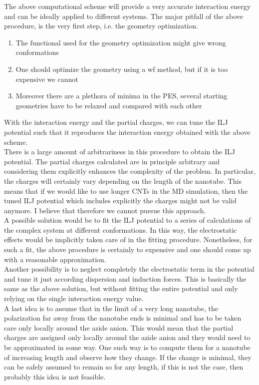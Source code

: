 \documentclass{article}
\begin{document}
%
The above computational scheme will provide a very accurate interaction energy and can be ideally applied to different systems. The major pitfall of the above procedure, is the very first step, i.e. the geometry optimization.
%
\begin{enumerate}
    \item The functional used for the geometry optimization might give wrong conformations
    \item One should optimize the geometry using a wf method, but if it is too expensive we cannot
    \item Moreover there are a plethora of minima in the PES, several starting geometries have to be relaxed and compared with each other
\end{enumerate}
%
\medskip
With the interaction energy and the partial charges, we can tune the ILJ potential such that it reproduces the interaction energy obtained with the above scheme.\\
\newline
There is a large amount of arbitrariness in this procedure to obtain the ILJ potential.
The partial charges calculated are in principle arbitrary and considering them explicitly enhances the complexity of the problem. In particular, the charges will certainly vary depending on the length of the nanotube. This means that if we would like to use longer CNTs in the MD simulation, then the tuned ILJ potential which includes explicitly the charges might not be valid anymore.
I believe that therefore we cannot pursue this approach.\\
A possible solution would be to fit the ILJ potential to a series of calculations of the complex system at different conformations. In this way, the electrostatic effects would be implicitly taken care of in the fitting procedure. Nonetheless, for such a fit, the above procedure is certainly to expensive and one should come up with a reasonable approximation.\\
Another possibility is to neglect completely the electrostatic term in the potential and tune it just according dispersion and induction forces. This is basically the same as the above solution, but without fitting the entire potential and only relying on the single interaction energy value.\\
A last idea is to assume that in the limit of a very long nanotube, the polarization far away from the nanotube ends is minimal and has to be taken care only locally around the azide anion. This would mean that the partial charges are assigned only locally around the azide anion and they would need to be approximated in some way. One such way is to compute them for a nanotube of increasing length and observe how they change. If the change is minimal, they can be safely assumed to remain so for any length, if this is not the case, then probably this idea is not feasible.
\end{document}
